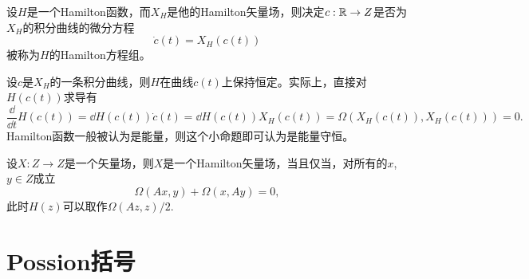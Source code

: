 \begin{para}
	设$H$是一个Hamilton函数，而$X_H$是他的Hamilton矢量场，则决定$c:\mathbb{R} \to Z$是否为$X_H$的积分曲线的微分方程
	\[
	\dot c(t)=X_H(c(t))
	\]
	被称为$H$的Hamilton方程组。

	设$c$是$X_H$的一条积分曲线，则$H$在曲线$c(t)$上保持恒定。实际上，直接对$H\left(c(t)\right)$求导有
	\[
	\frac{\dd}{\dd t}H(c(t))=\dd H(c(t))\dot c(t)=\dd H(c(t))X_H\left(c(t)\right)=\Omega\left(X_H\left(c(t)\right),X_H\left(c(t)\right)\right)=0.
	\]
	Hamilton函数一般被认为是能量，则这个小命题即可认为是能量守恒。
\end{para}

\begin{thm}
	设$X:Z\to Z$是一个矢量场，则$X$是一个Hamilton矢量场，当且仅当，对所有的$x$, $y\in Z$成立
	\[
	\Omega(Ax,y)+\Omega(x,Ay)=0,
	\]
	此时$H(z)$可以取作$\Omega(Az,z)/2$.
\end{thm}

\section{Possion括号}